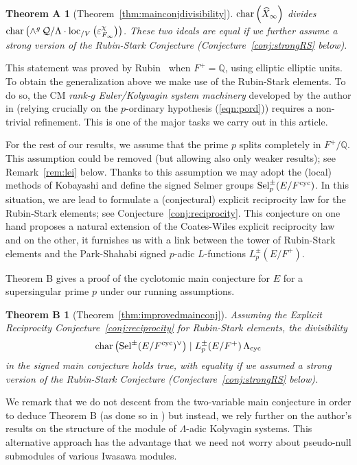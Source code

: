\documentclass[12pt]{amsart}
\newtheorem*{thma}{Theorem A}
\newtheorem*{thmb}{Theorem B}
\numberwithin{equation}{section}
\begin{document}
\begin{thma}[Theorem~\ref{thm:mainconjdivisibility}]
$\textup{char}\left(\widehat{X}_\infty\right)$ divides $\textup{char} \left(\wedge^g \,\mathcal{Q}/{\Lambda}\cdot  {\textup{loc}_{/V}}\left(\varepsilon_{F_\infty}^\chi \right)\right)$. These two ideals are equal if we further assume a strong version of the Rubin-Stark Conjecture (Conjecture~\ref{conj:strongRS} below).
\end{thma}
This statement was proved by Rubin~\cite[\S11]{rubinmainconj} when $F^+={\mathbb{Q}}$, using elliptic elliptic units. To obtain the generalization above we make use of the Rubin-Stark elements. To do so, the CM \emph{rank-$g$ Euler/Kolyvagin system machinery} developed by the author in \cite{kbbCMabvar} (relying crucially on the $p$-ordinary hypothesis (\ref{eqn:pord})) requires a non-trivial refinement. 
This is one of the major tasks we carry out in this article.

For the rest of our results, we assume that the prime $p$ splits completely in $F^+/{\mathbb{Q}}$. This assumption could be removed (but allowing also only weaker results); see Remark~\ref{rem:lei} below. Thanks to this assumption we may adopt the (local) methods of Kobayashi \cite{kobayashi03} and define the signed Selmer groups $\textup{Sel}^\pm_p(E/F^{\textup{cyc}})$. In this situation, we are lead to formulate a (conjectural) explicit reciprocity law for the Rubin-Stark elements; see Conjecture~\ref{conj:reciprocity}. This conjecture on one hand proposes a natural extension of the Coates-Wiles explicit reciprocity law and on the other, it furnishes us with a link between the tower of Rubin-Stark elements and the Park-Shahabi signed $p$-adic $L$-functions $L_p^\pm(E/F^+)$. 

Theorem B gives a proof of the cyclotomic main conjecture for $E$ for a supersingular prime $p$ under our running assumptions. 

 \begin{thmb}[Theorem~\ref{thm:improvedmainconj}]
Assuming the Explicit Reciprocity Conjecture~\ref{conj:reciprocity} for Rubin-Stark elements, the divisibility 
$$\textup{char}\left(\textup{Sel}^\pm(E/F^{\textup{cyc}})^\vee\right)\mid L_p^\pm(E/F^+)\,{\Lambda}_{\textup{cyc}}$$
in the signed main conjecture holds true, with equality if we assumed a strong version of the Rubin-Stark Conjecture (Conjecture~\ref{conj:strongRS} below).
 \end{thmb}
 
 We remark that we do not descent from the two-variable main conjecture in order to deduce Theorem B (as done so in \cite{pollackrubin}) but instead, we rely further on the author's results on the structure of the module of ${\Lambda}$-adic Kolyvagin systems. This alternative approach has the advantage that we need not worry about pseudo-null submodules of various Iwasawa modules.
\end{document}
